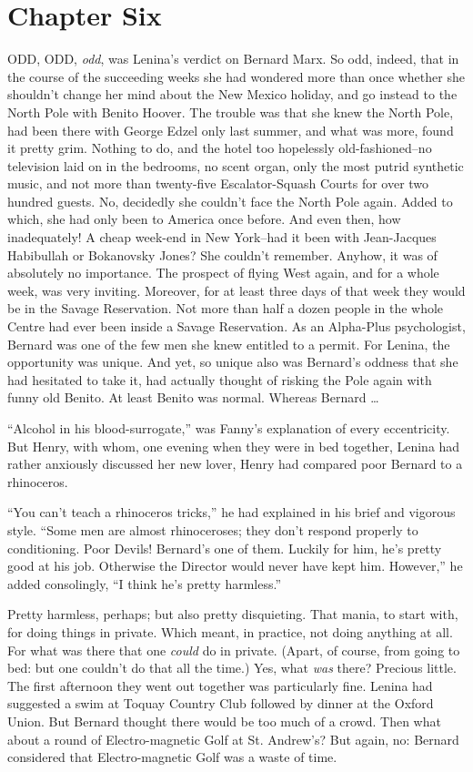 \documentclass[12pt]{report}
\newcommand{\mychapter}[2]{
\setcounter{chapter}{#1}
    \setcounter{section}{0}
    \chapter*{#2}
    \addcontentsline{toc}{chapter}{#2}
}
\begin{document}
\mychapter{6}{Chapter Six}
ODD, ODD, \emph{odd}, was Lenina's verdict on Bernard Marx. So odd,
indeed, that in the course of the succeeding weeks she had wondered more
than once whether she shouldn't change her mind about the New Mexico
holiday, and go instead to the North Pole with Benito Hoover. The
trouble was that she knew the North Pole, had been there with George
Edzel only last summer, and what was more, found it pretty grim. Nothing
to do, and the hotel too hopelessly old-fashioned--no television laid on
in the bedrooms, no scent organ, only the most putrid synthetic music,
and not more than twenty-five Escalator-Squash Courts for over two
hundred guests. No, decidedly she couldn't face the North Pole again.
Added to which, she had only been to America once before. And even then,
how inadequately! A cheap week-end in New York--had it been with
Jean-Jacques Habibullah or Bokanovsky Jones? She couldn't remember.
Anyhow, it was of absolutely no importance. The prospect of flying West
again, and for a whole week, was very inviting. Moreover, for at least
three days of that week they would be in the Savage Reservation. Not
more than half a dozen people in the whole Centre had ever been inside a
Savage Reservation. As an Alpha-Plus psychologist, Bernard was one of
the few men she knew entitled to a permit. For Lenina, the opportunity
was unique. And yet, so unique also was Bernard's oddness that she had
hesitated to take it, had actually thought of risking the Pole again
with funny old Benito. At least Benito was normal. Whereas Bernard
\ldots{}

``Alcohol in his blood-surrogate,'' was Fanny's explanation of every
eccentricity. But Henry, with whom, one evening when they were in bed
together, Lenina had rather anxiously discussed her new lover, Henry had
compared poor Bernard to a rhinoceros.

``You can't teach a rhinoceros tricks,'' he had explained in his brief
and vigorous style. ``Some men are almost rhinoceroses; they don't
respond properly to conditioning. Poor Devils! Bernard's one of them.
Luckily for him, he's pretty good at his job. Otherwise the Director
would never have kept him. However,'' he added consolingly, ``I think
he's pretty harmless.''

Pretty harmless, perhaps; but also pretty disquieting. That mania, to
start with, for doing things in private. Which meant, in practice, not
doing anything at all. For what was there that one \emph{could} do in
private. (Apart, of course, from going to bed: but one couldn't do that
all the time.) Yes, what \emph{was} there? Precious little. The first
afternoon they went out together was particularly fine. Lenina had
suggested a swim at Toquay Country Club followed by dinner at the Oxford
Union. But Bernard thought there would be too much of a crowd. Then what
about a round of Electro-magnetic Golf at St. Andrew's? But again, no:
Bernard considered that Electro-magnetic Golf was a waste of time.
\end{document}

